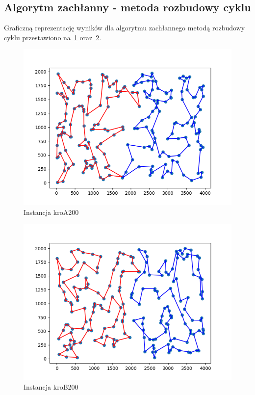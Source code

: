 \documentclass[11pt]{article}
\begin{document}
\subsection{Algorytm zachłanny - metoda rozbudowy cyklu}\label{subsec:algorytm-zachanny---metoda-rozbudowy-cyklu2}
Graficzną reprezentację wyników dla algorytmu zachłannego metodą rozbudowy cyklu przestawiono na~\ref{fig:Greedy-cycle-kroA} oraz~\ref{fig:Greedy-cycle-kroB}.

\begin{figure}[H]
    \centering
    \includegraphics{best_paths/greedy_cheapest_insertion_kroA200.tsp.png}
    \caption{Instancja kroA200}
    \label{fig:Greedy-cycle-kroA}
\end{figure}
\begin{figure}[H]
    \centering
    \includegraphics{best_paths/greedy_cheapest_insertion_kroB200.tsp.png}
    \caption{Instancja kroB200}
    \label{fig:Greedy-cycle-kroB}
\end{figure}
\end{document}
